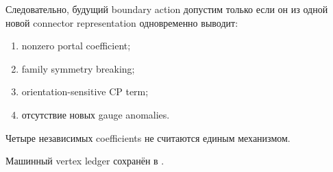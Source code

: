 Следовательно, будущий boundary action допустим только если он из одной новой
connector representation одновременно выводит:
\begin{enumerate}
\item nonzero portal coefficient;
\item family symmetry breaking;
\item orientation-sensitive CP term;
\item отсутствие новых gauge anomalies.
\end{enumerate}
Четыре независимых coefficients не считаются единым механизмом.

Машинный vertex ledger сохранён в
.